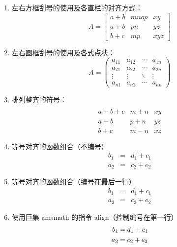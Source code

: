 \begin{enumerate}
  \item 左右方框刮号的使用及各直栏的对齐方式：
        $$ A = \left[
            \begin{array}{clr}
                a+b & mnop  & xy \\
                a+b & pn    & yz \\
                b+c & mp    & xyz
            \end{array} \right] $$

  \item 左右圆框刮号的使用及各式点状：
        $$ A=\left(
            \begin{array}{cccc}
                a_{11} & a_{12} & \cdots & a_{1n}\\
                a_{21} & a_{22} & \cdots & a_{2n}\\
                \vdots & \vdots & \ddots & \vdots\\
                a_{n1} & a_{n2} & \cdots & a_{nn}
            \end{array} \right) $$

  \item 排列整齐的符号：
        $$ \begin{array}{clr}\\
            a+b+c   & m+n & xy \\
            a+b     & p+n & yz \\
            b+c     & m-n & xz
        \end{array} $$

    \item 等号对齐的函数组合（不编号）
        \begin{eqnarray*}
          b_1 &=& d_1+c_1 \\
          a_2 &=& c_2+e_2
        \end{eqnarray*}

    \item 等号对齐的函数组合（编号在最后一行）
        \begin{eqnarray}
\nonumber b_1 &=& d_1+c_1 \\
          a_2 &=& c_2+e_2
        \end{eqnarray}

    \item 使用巨集 amsmath 的指令 align（控制编号在第一行）
        \begin{align}
            b_1 &= d_1+c_1\\
            a_2 &= c_2+e_2 \notag
        \end{align}


\end{enumerate}
